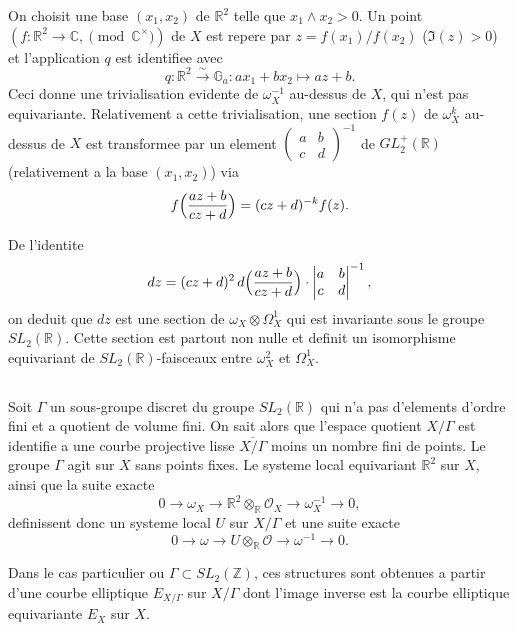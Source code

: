 \documentclass[11pt,reqno]{amsart}
\theoremstyle{plain}
\theoremstyle{remark}
\newcommand{\shO}{\mathcal{O}}
\newcommand{\Z}{\mathbb{Z}}
\newcommand{\R}{\mathbb{R}}
\newcommand{\C}{\mathbb{C}}
\newcommand{\Ga}{\mathbb{G}_a}
\newcommand{\xto}[1]{\xrightarrow{#1}}
\numberwithin{equation}{section}
\begin{document}
On choisit une base $(x_1, x_2)$ de $\R^2$ telle que $x_1 \wedge x_2 > 0$. Un point $(f: \R^2 \to \C, \pmod{\C^\times})$ de $X$ est repere par $z = f(x_1)/f(x_2)$ ($\Im(z) > 0$) et l'application $q$ est identifiee avec
\[
q: \R^2 \xto{\sim} \Ga: ax_1 + bx_2 \mapsto az + b.
\]
Ceci donne une trivialisation evidente de $\omega_X^{-1}$ au-dessus de $X$, qui n'est pas equivariante. Relativement a cette trivialisation, une section $f(z)$ de $\omega_X^k$ au-dessus de $X$ est transformee par un element $\begin{pmatrix} a & b \\ c & d \end{pmatrix}^{-1}$ de $GL_2^+(\R)$ (relativement a la base $(x_1, x_2)$) via
\begin{equation}
f\Bigl(\frac{az+b}{cz+d}\Bigr) = (cz+d)^{-k} f(z).
\end{equation}

De l'identite
\[
dz = (cz+d)^2 \, d\Bigl(\frac{az+b}{cz+d}\Bigr) \cdot \begin{vmatrix} a & b \\ c & d \end{vmatrix}^{-1},
\]
on deduit que $dz$ est une section de $\omega_X \otimes \Omega^1_X$ qui est invariante sous le groupe $SL_2(\R)$. Cette section est partout non nulle et definit un isomorphisme equivariant de $SL_2(\R)$-faisceaux entre $\omega_X^2$ et $\Omega^1_X$.

\subsection{}\label{subsec:2.4}

Soit $\Gamma$ un sous-groupe discret du groupe $SL_2(\R)$ qui n'a pas d'elements d'ordre fini et a quotient de volume fini. On sait alors que l'espace quotient $X/\Gamma$ est identifie a une courbe projective lisse $\overline{X/\Gamma}$ moins un nombre fini de points. Le groupe $\Gamma$ agit sur $X$ sans points fixes. Le systeme local equivariant $\R^2$ sur $X$, ainsi que la suite exacte
\[
0 \to \omega_X \to \R^2 \otimes_\R \shO_X \to \omega_X^{-1} \to 0,
\]
definissent donc un systeme local $U$ sur $X/\Gamma$ et une suite exacte
\begin{equation}\label{eq:2.5}
0 \to \omega \to U \otimes_\R \shO \to \omega^{-1} \to 0.
\end{equation}

Dans le cas particulier ou $\Gamma \subset SL_2(\Z)$, ces structures sont obtenues a partir d'une courbe elliptique $E_{X/\Gamma}$ sur $X/\Gamma$ dont l'image inverse est la courbe elliptique equivariante $E_X$ sur $X$.
\end{document}
